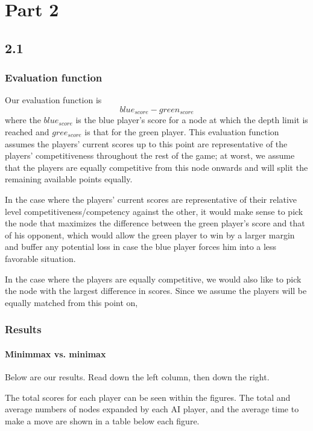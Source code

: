 \section*{Part 2}
\subsection*{2.1}
\begin{multicols*}{2}
\subsubsection*{Evaluation function}
Our evaluation function is
\begin{equation}
  blue_{score} - green_{score}
\end{equation}
where the $blue_{score}$ is the blue player's score for a node at which the depth limit is reached and $gree_{score}$ is that for the green player. This evaluation function assumes the players' current scores up to this point are representative of the players' competitiveness throughout the rest of the game; at worst, we assume that the players are equally competitive from this node onwards and will split the remaining available points equally.

In the case where the players' current scores are representative of their relative level competitiveness/competency against the other, it would make sense to pick the node that maximizes the difference between the green player's score and that of his opponent, which would allow the green player to win by a larger margin and buffer any potential loss in case the blue player forces him into a less favorable situation.

In the case where the players are equally competitive, we would also like to pick the node with the largest difference in scores. Since we assume the players will be equally matched from this point on, 

\subsubsection*{Results}
\paragraph*{Minimmax vs. minimax}
Below are our results. Read down the left column, then down the right.

The total scores for each player can be seen within the figures. The total and average numbers of nodes expanded by each AI player, and the average time to make a move are shown in a table below each figure.


\end{multicols*}
